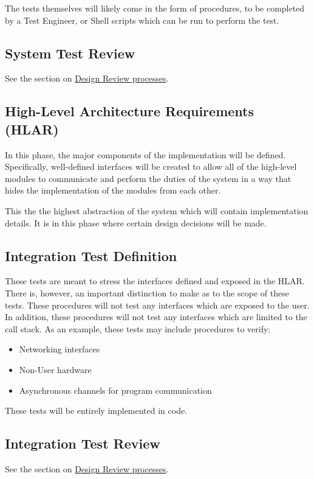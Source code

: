 \documentclass[12pt]{article}
\begin{document}
The tests themselves will likely come in the form of procedures, to be
completed by a Test Engineer, or Shell scripts which can be run to perform the
test.

\subsection{System Test Review}
See the section on \hyperref[sec:review]{Design Review processes}.

\subsection{High-Level Architecture Requirements (HLAR)}
In this phase, the major components of the implementation will be defined.
Specifically, well-defined interfaces will be created to allow all of the
high-level modules to communicate and perform the duties of the system in a
way that hides the implementation of the modules from each other.

This the the highest abstraction of the system which will contain
implementation details. It is in this phase where certain design decisions
will be made.

\subsection{Integration Test Definition}
These tests are meant to stress the interfaces defined and exposed in the
HLAR. There is, however, an important distinction to make as to the scope
of these tests. These procedures will not test any interfaces which are
exposed to the user. In addition, these procedures will not test any
interfaces which are limited to the call stack. As an example, these tests may
include procedures to verify:

\begin{itemize}
\item Networking interfaces
\item Non-User hardware
\item Asynchronous channels for program communication
\end{itemize}

These tests will be entirely implemented in code.

\subsection{Integration Test Review}
See the section on \hyperref[sec:review]{Design Review processes}.
\end{document}
